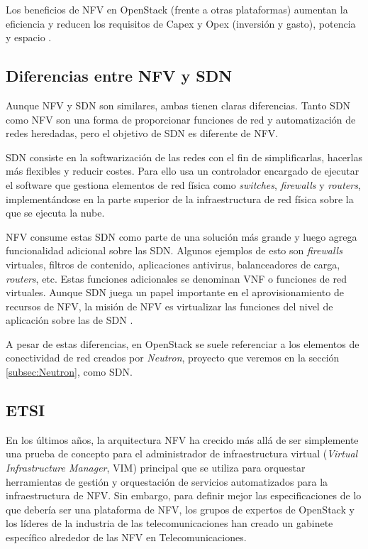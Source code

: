 Los beneficios de NFV en OpenStack (frente a otras plataformas) aumentan la eficiencia y reducen los requisitos de Capex y Opex (inversión y gasto), potencia y espacio \cite{silverman_what_2018}.

\subsection{Diferencias entre NFV y SDN}
Aunque NFV y SDN son similares, ambas tienen claras diferencias. Tanto SDN como NFV son una forma de proporcionar funciones de red y automatización de redes heredadas, pero el objetivo de SDN es diferente de NFV. 

SDN consiste en la softwarización de las redes con el fin de simplificarlas, hacerlas más flexibles y reducir costes. Para ello usa un controlador encargado de ejecutar el software que gestiona elementos de red física como \textit{switches}, \textit{firewalls} y \textit{routers}, implementándose en la parte superior de la infraestructura de red física sobre la que se ejecuta la nube. 

NFV consume estas SDN como parte de una solución más grande y luego agrega funcionalidad adicional sobre las SDN. Algunos ejemplos de esto son \textit{firewalls} virtuales, filtros de contenido, aplicaciones antivirus, balanceadores de carga, \textit{routers}, etc. Estas funciones adicionales se denominan VNF o funciones de red virtuales. Aunque SDN juega un papel importante en el aprovisionamiento de recursos de NFV, la misión de NFV es virtualizar las funciones del nivel de aplicación sobre las de SDN \cite{silverman_difference_2018}.

A pesar de estas diferencias, en OpenStack se suele referenciar a los elementos de conectividad de red creados por \textit{Neutron}, proyecto que veremos en la sección \ref{subsec:Neutron}, como SDN.


\subsection{ETSI}
En los últimos años, la arquitectura NFV ha crecido más allá de ser simplemente una prueba de concepto para el administrador de infraestructura virtual (\textit{Virtual Infrastructure Manager}, VIM) principal que se utiliza para orquestar herramientas de gestión y orquestación de servicios automatizados para la infraestructura de NFV. Sin embargo, para definir mejor las especificaciones de lo que debería ser una plataforma de NFV, los grupos de expertos de OpenStack y los líderes de la industria de las telecomunicaciones han creado un gabinete específico alrededor de las NFV en Telecomunicaciones.

